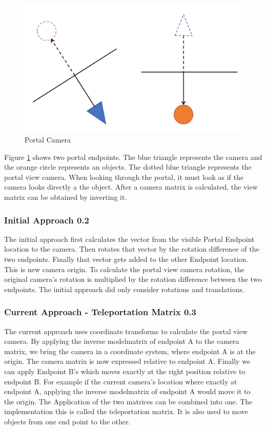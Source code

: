 \begin{figure}[h]
	\includegraphics[width=\linewidth]{images/camera_matrices.png}
	\caption{Portal Camera}
	\label{fig:cameramatrices}
\end{figure}

Figure \ref{fig:cameramatrices} shows two portal endpoints. The blue triangle represents the camera and the orange circle represents an objects. The dotted blue triangle represents the portal view camera.
When looking through the portal, it must look as if the camera looks directly a the object. After a camera matrix is calculated, the view matrix can be obtained by inverting it.

\subsubsection{Initial Approach 0.2}
The initial approach first calculates the vector from the visible Portal Endpoint location to the camera. Then rotates that vector by the rotation difference of the two endpoints. Finally that vector gets added to the other Endpoint location. This is new camera origin.
To calculate the portal view camera rotation, the original camera's rotation is multiplied by the rotation difference between the two endpoints.
The initial approach did only consider rotations and translations.

\subsubsection{Current Approach - Teleportation Matrix 0.3}
The current approach uses coordinate transforms to calculate the portal view camera. By applying the inverse modelmatrix of endpoint A to the camera matrix, we bring the camera in a coordinate system, where endpoint A is at the origin. The camera matrix is now expressed relative to endpoint A. Finally we can apply Endpoint B's which moves exactly at the right position relative to endpoint B.
For example if the current camera's location where exactly at endpoint A, applying the inverse modelmatrix of endpoint A would move it to the origin.
The Application of the two matrices can be combined into one. The implementation this is called the teleportation matrix. It is also used to move objects from one end point to the other.  

